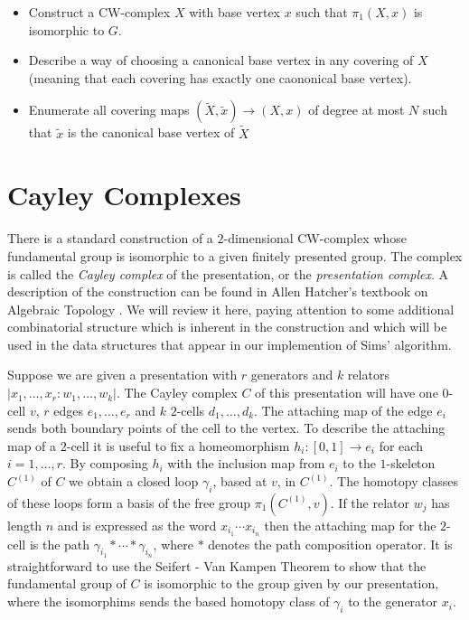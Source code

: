 \documentclass[12pt]{article}
\begin{document}
  \begin{itemize}
  \item Construct a CW-complex $X$ with base vertex $x$ such that
    $\pi_1(X, x)$ is isomorphic to $G$.
   \item Describe a way of choosing a canonical base vertex in any
     covering of $X$ (meaning that each covering has exactly one caononical base vertex).
   \item Enumerate all covering maps $(\tilde X, \tilde x)\to (X,
     x)$ of degree at most $N$ such that $\tilde x$ is the canonical base
     vertex of $\tilde X$
   \end{itemize}

   \section{Cayley Complexes}

   There is a standard construction of a $2$-dimensional CW-complex whose
   fundamental group is isomorphic to a given finitely presented group.  The
   complex is called the {\it Cayley complex} of the presentation, or the {\it
     presentation complex}.  A description of the construction can be found in
   Allen Hatcher's textbook on Algebraic Topology \cite[Section 1.3]{Hatcher}.
   We will review it here, paying attention to some additional combinatorial
   structure which is inherent in the construction and which will be used in the
   data structures that appear in our implemention of Sims' algorithm.

   Suppose we are given a presentation with $r$ generators and $k$ relators
   $|x_1, \ldots, x_r : w_1, \ldots, w_k|$.  The Cayley complex $C$ of this
   presentation will have one $0$-cell $v$, $r$ edges $e_1, \ldots, e_r$ and
   $k$ $2$-cells $d_1, \ldots, d_k$. The attaching map of the edge $e_i$
   sends both boundary points of the cell to the vertex.  To describe the
   attaching map of a $2$-cell it is useful to fix a homeomorphism
   $h_i : [0,1] \to e_i$ for each $i = 1, \ldots, r$.  By composing $h_i$ with
   the inclusion map from $e_i$ to the $1$-skeleton $C^{(1)}$ of $C$ we obtain a
   closed loop $\gamma_i$, based at $v$, in $C^{(1)}$.  The homotopy classes of
   these loops form a basis of the free group $\pi_1(C^{(1)}, v)$.  If the
   relator $w_j$ has length $n$ and is expressed as the word
   $x_{i_1}\cdots x_{i_n}$ then the attaching map for the $2$-cell is the path
   $\gamma_{i_1}\ast\cdots\ast\gamma_{i_n}$, where $\ast$ denotes the path
   composition operator.  It is straightforward \cite[Corollary 1.28]{Hatcher}
   to use the Seifert - Van Kampen Theorem to show that the fundamental group of
   $C$ is isomorphic to the group given by our presentation, where the
   isomorphims sends the based homotopy class of $\gamma_i$ to the generator $x_i$.
\end{document}
